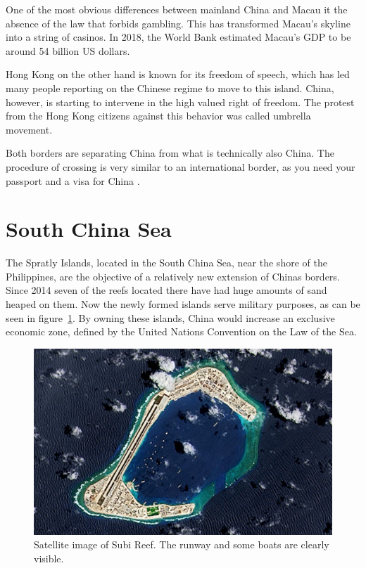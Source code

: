 \documentclass[conference]{IEEEtran}
\begin{document}
	One of the most obvious differences between mainland China and Macau it the absence of the law that forbids gambling. This has transformed Macau's skyline into a string of casinos. In 2018, the World Bank estimated Macau's GDP to be around 54 billion US dollars.
	
	Hong Kong on the other hand is known for its freedom of speech, which has led many people reporting on the Chinese regime to move to this island. China, however, is starting to intervene in the high valued right of freedom. The protest from the Hong Kong citizens against this behavior was called umbrella movement.
	
	Both borders are separating China from what is technically also China. The procedure of crossing is very similar to an international border, as you need your passport and a visa for China\cite{macauLifestyle_macauZhuhaiTheUltimateBorderCrossingGuide} \cite{yp_chinaIsErasingItsBorderWithHongKong}.
	
	\section{South China Sea}
	The Spratly Islands, located in the South China Sea, near the shore of the Philippines, are the objective of a relatively new extension of Chinas borders. Since 2014 seven of the reefs located there have had huge amounts of sand heaped on them. Now the newly formed islands serve military purposes, as can be seen in figure~\ref{pic:southChinaSea_subiReef}. By owning these islands, China would increase an exclusive economic zone, defined by the United Nations Convention on the Law of the Sea\cite{unitedNations_lawOfTheSea}.
	
	\begin{figure}[t]
		\centering
		\includegraphics[width=\linewidth]{img/southChinaSea_subiReef.jpg}
		\caption{Satellite image of Subi Reef\cite{theTelegraph_chinaLandsMilitaryPlaneAtThirdSpratlyIsland}. The runway and some boats are clearly visible.}
		\label{pic:southChinaSea_subiReef}
	\end{figure}
	
\end{document}
